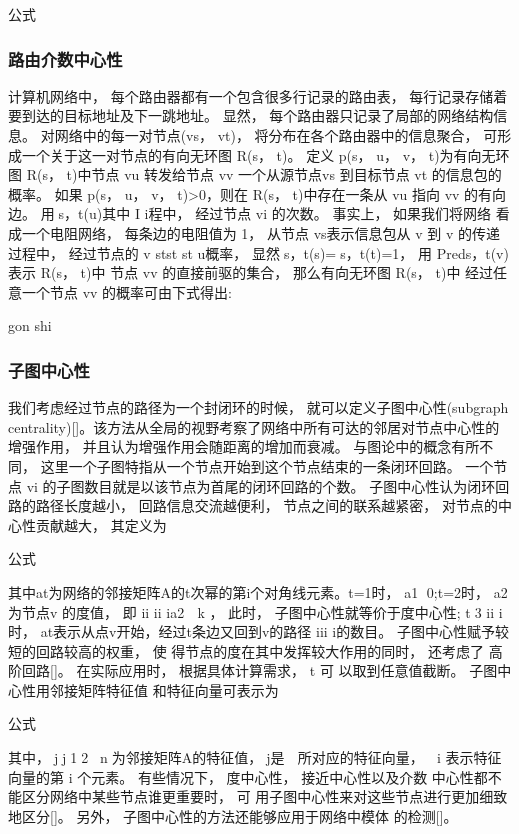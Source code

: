 				公式
	\subsubsection{路由介数中心性}
	计算机网络中， 每个路由器都有一个包含很多行记录的路由表， 每行记录存储着要到达的目标地址及下一跳地址。 显然， 每个路由器只记录了局部的网络结构信息。 对网络中的每一对节点(vs， vt)， 将分布在各个路由器中的信息聚合， 可形成一个关于这一对节点的有向无环图 R(s， t)。 定义 p(s， u， v， t)为有向无环图 R(s， t)中节点 vu 转发给节点 vv 一个从源节点vs 到目标节点 vt 的信息包的概率。 如果 p(s， u， v， t)>0，则在 R(s， t)中存在一条从 vu 指向 vv 的有向边。 用s，t(u)其中 I i程中， 经过节点 vi 的次数。 事实上， 如果我们将网络 看成一个电阻网络， 每条边的电阻值为 1， 从节点 vs表示信息包从 v 到 v 的传递过程中， 经过节点的 v stst st u概率， 显然s，t(s)=s，t(t)=1， 用 Preds，t(v)表示 R(s， t)中 节点 vv 的直接前驱的集合， 那么有向无环图 R(s， t)中 经过任意一个节点 vv 的概率可由下式得出:

	gon shi
	\subsubsection{子图中心性}
	我们考虑经过节点的路径为一个封闭环的时候， 就可以定义子图中心性(subgraph centrality)[]。该方法从全局的视野考察了网络中所有可达的邻居对节点中心性的增强作用， 并且认为增强作用会随距离的增加而衰减。 与图论中的概念有所不同， 这里一个子图特指从一个节点开始到这个节点结束的一条闭环回路。 一个节点 vi 的子图数目就是以该节点为首尾的闭环回路的个数。 子图中心性认为闭环回路的路径长度越小， 回路信息交流越便利， 节点之间的联系越紧密， 对节点的中心性贡献越大， 其定义为

				公式

				其中at为网络的邻接矩阵A的t次幂的第i个对角线元素。t=1时， a1 0;t=2时， a2为节点v 的度值， 即 ii ii ia2  k ， 此时， 子图中心性就等价于度中心性; t3 ii i时， at表示从点v开始，经过t条边又回到v的路径 iii i的数目。 子图中心性赋予较短的回路较高的权重， 使 得节点的度在其中发挥较大作用的同时， 还考虑了 高阶回路[]。 在实际应用时， 根据具体计算需求， t 可 以取到任意值截断。 子图中心性用邻接矩阵特征值 和特征向量可表示为

				公式

				其中，jj1，2，，n为邻接矩阵A的特征值，j是  所对应的特征向量，  i 表示特征向量的第 i 个元素。 有些情况下， 度中心性， 接近中心性以及介数 中心性都不能区分网络中某些节点谁更重要时， 可 用子图中心性来对这些节点进行更加细致地区分[]。 另外， 子图中心性的方法还能够应用于网络中模体 的检测[]。

